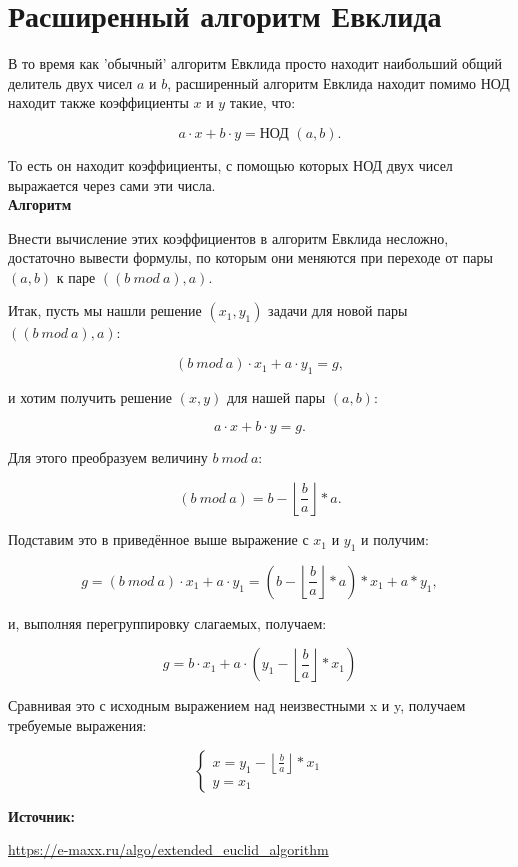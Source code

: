 \documentclass[12pt,a4paper]{scrartcl}
\begin{document}
	
\section{Расширенный алгоритм Евклида}

В то время как 'обычный' алгоритм Евклида просто находит наибольший общий делитель двух чисел $a$ и $b$, расширенный алгоритм Евклида находит помимо НОД находит также коэффициенты $x$ и $y$ такие, что:

$$a \cdot x + b \cdot y = \text{НОД } (a, b).$$

То есть он находит коэффициенты, с помощью которых НОД двух чисел выражается через сами эти числа.\\

\textbf{Алгоритм}

Внести вычисление этих коэффициентов в алгоритм Евклида несложно, достаточно вывести формулы, по которым они меняются при переходе от пары $(a,b)$ к паре $((b\ mod\ a),a)$.

Итак, пусть мы нашли решение $(x_1,y_1)$ задачи для новой пары $((b\ mod\ a),a)$:

$$(b\ mod\ a) \cdot x_1 + a \cdot y_1 = g,$$

и хотим получить решение $(x,y)$ для нашей пары $(a,b)$:

$$a \cdot x + b \cdot y = g.$$

Для этого преобразуем величину $b\ mod\ a$:

$$(b\ mod\ a) = b - \left\lfloor \frac{b}{a} \right\rfloor * a.$$

Подставим это в приведённое выше выражение с $x_1$ и $y_1$ и получим:

$$g = (b\ mod\ a) \cdot x_1 + a \cdot y_1 = \left( b - \left\lfloor \frac{b}{a} \right\rfloor *a \right) * x_1 + a*y_1,$$

и, выполняя перегруппировку слагаемых, получаем:

$$g = b \cdot x_1 + a \cdot \left( y_1 - \left\lfloor \frac{b}{a} \right\rfloor *x_1 \right)$$

Сравнивая это с исходным выражением над неизвестными x и y, получаем требуемые выражения:

$$\begin{cases}
	x = y_1 - \left\lfloor \frac{b}{a} \right\rfloor*x_1 \\
	y=x_1
\end{cases}$$

\textbf{Источник:}

\href{https://e-maxx.ru/algo/extended_euclid_algorithm}{https://e-maxx.ru/algo/extended\_euclid\_algorithm}
	
\end{document}
